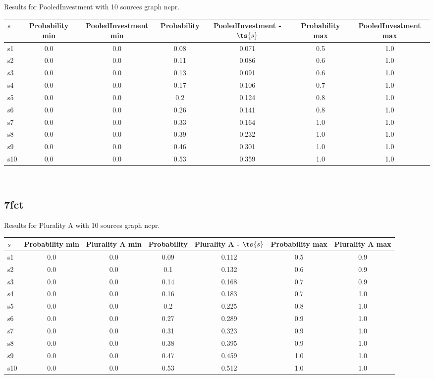 \documentclass{article}
\begin{document}
\noindent Results for PooledInvestment with 10 sources graph ncpr.

\noindent\begin{tabular}{|l|c|c|c|c|c|c|}
\hline
$s$& Probability min & PooledInvestment min & Probability & PooledInvestment - $\ts{s}$ & Probability max & PooledInvestment max\\
\hline
s1 &0.0 & 0.0 & 0.08 & 0.071 & 0.5 & 1.0\\
\hline
s2 &0.0 & 0.0 & 0.11 & 0.086 & 0.6 & 1.0\\
\hline
s3 &0.0 & 0.0 & 0.13 & 0.091 & 0.6 & 1.0\\
\hline
s4 &0.0 & 0.0 & 0.17 & 0.106 & 0.7 & 1.0\\
\hline
s5 &0.0 & 0.0 & 0.2 & 0.124 & 0.8 & 1.0\\
\hline
s6 &0.0 & 0.0 & 0.26 & 0.141 & 0.8 & 1.0\\
\hline
s7 &0.0 & 0.0 & 0.33 & 0.164 & 1.0 & 1.0\\
\hline
s8 &0.0 & 0.0 & 0.39 & 0.232 & 1.0 & 1.0\\
\hline
s9 &0.0 & 0.0 & 0.46 & 0.301 & 1.0 & 1.0\\
\hline
s10 &0.0 & 0.0 & 0.53 & 0.359 & 1.0 & 1.0\\
\hline
\end{tabular}\\

\newpage

\subsection{7fct}

\noindent Results for Plurality A with 10 sources graph ncpr.

\noindent\begin{tabular}{|l|c|c|c|c|c|c|}
\hline
$s$& Probability min & Plurality A min & Probability & Plurality A - $\ts{s}$ & Probability max & Plurality A max\\
\hline
s1 &0.0 & 0.0 & 0.09 & 0.112 & 0.5 & 0.9\\
\hline
s2 &0.0 & 0.0 & 0.1 & 0.132 & 0.6 & 0.9\\
\hline
s3 &0.0 & 0.0 & 0.14 & 0.168 & 0.7 & 0.9\\
\hline
s4 &0.0 & 0.0 & 0.16 & 0.183 & 0.7 & 1.0\\
\hline
s5 &0.0 & 0.0 & 0.2 & 0.225 & 0.8 & 1.0\\
\hline
s6 &0.0 & 0.0 & 0.27 & 0.289 & 0.9 & 1.0\\
\hline
s7 &0.0 & 0.0 & 0.31 & 0.323 & 0.9 & 1.0\\
\hline
s8 &0.0 & 0.0 & 0.38 & 0.395 & 0.9 & 1.0\\
\hline
s9 &0.0 & 0.0 & 0.47 & 0.459 & 1.0 & 1.0\\
\hline
s10 &0.0 & 0.0 & 0.53 & 0.512 & 1.0 & 1.0\\
\hline
\end{tabular}\\
\end{document}
